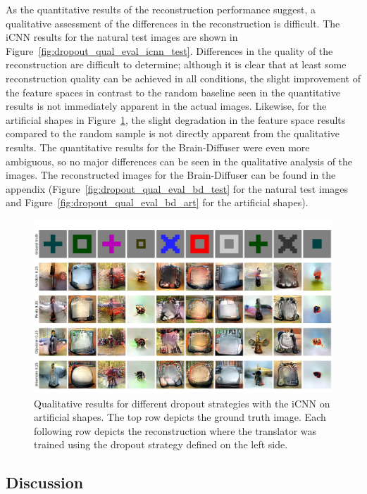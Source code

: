 As the quantitative results of the reconstruction performance suggest, a qualitative assessment of the differences in the reconstruction is difficult. The iCNN results for the natural test images are shown in Figure~\ref{fig:dropout_qual_eval_icnn_test}. Differences in the quality of the reconstruction are difficult to determine; although it is clear that at least some reconstruction quality can be achieved in all conditions, the slight improvement of the feature spaces in contrast to the random baseline  seen in the quantitative results is not immediately apparent in the actual images. Likewise, for the artificial shapes in Figure~\ref{fig:dropout_qual_eval_icnn_art}, the slight degradation in the feature space results compared to the random sample is not directly apparent from the qualitative results. The quantitative results for the Brain-Diffuser were even more ambiguous, so no major differences can be seen in the qualitative analysis of the images. The reconstructed images for the Brain-Diffuser can be found in the appendix (Figure~\ref{fig:dropout_qual_eval_bd_test} for the natural test images and Figure~\ref{fig:dropout_qual_eval_bd_art} for the artificial shapes).


\begin{figure}[ht]
  \centering
  \includegraphics[width=1\textwidth]{plots/dropout_qual_eval_icnn_art.JPEG}
  \caption[Experiment 1: Reconstructed images for iCNN on artificial shapes]{Qualitative results for different dropout strategies with the iCNN on artificial shapes. The top row depicts the ground truth image. Each following row depicts the reconstruction where the translator was trained using the dropout strategy defined on the left side.}\label{fig:dropout_qual_eval_icnn_art}
\end{figure}

\subsection{Discussion}
  
